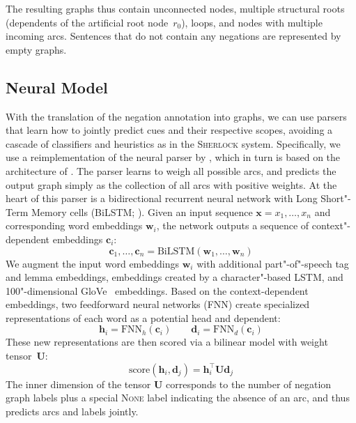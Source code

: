 \documentclass[11pt,a4paper]{article}
\let\vec=\mathbold
\theoremstyle{plain}
\begin{document}
The resulting graphs thus contain unconnected nodes, multiple structural roots (dependents of the artificial root node~$r_0$),
loops, and nodes with multiple incoming arcs.
Sentences that do not contain any negations are represented by empty graphs.

\subsection{Neural Model}

With the translation of the negation annotation into
graphs, we can use parsers that learn how to jointly predict cues
and their respective scopes, avoiding a cascade of classifiers and
heuristics as in the \textsc{Sherlock} system.
Specifically, we use a reimplementation of the neural parser by
\citet{dozat2018simpler}, which in turn is based on
the architecture of \citet{kiperwasser2016simple}.
The parser learns to weigh all possible arcs, and predicts the output graph
simply as the collection of all arcs with positive weights.
At the heart of this parser is a bidirectional recurrent neural network
with Long Short"-Term Memory cells (BiLSTM;
\citealp{hochreiter1997long}).
Given an input sequence $\vec{x}=x_1,\dots,x_n$ and corresponding word embeddings $\vec{w}_i$, the network outputs a sequence
of context"-dependent embeddings $\vec{c}_i$:
\begin{displaymath}
  \vec{c}_1, \dots, \vec{c}_n = \text{BiLSTM}(\vec{w}_1, \dots, \vec{w}_n)
\end{displaymath}
We augment the input word embeddings $\vec{w}_i$ with additional part"-of"-speech tag and
lemma embeddings, embeddings created by a character"-based LSTM, and
100"-dimensional GloVe~\citep{pennington2014glove} embeddings.
Based on the context-dependent embeddings, two feedforward neural networks
(FNN) create specialized representations of each word as a potential head and
dependent:
\begin{displaymath}
  \vec{h}_i = \text{FNN}_h(\vec{c}_i) \qquad
  \vec{d}_i = \text{FNN}_d(\vec{c}_i)
\end{displaymath}
These new representations are then scored via a bilinear model with weight 
tensor~$\vec{U}$:
\begin{displaymath}
  \text{score}(\vec{h}_i, \vec{d}_j) = \vec{h}_i^\top \vec{U} \vec{d}_j
\end{displaymath}
The inner dimension of the tensor $\vec{U}$ corresponds to the number of negation graph labels
plus a special \textsc{None} label indicating the absence of an arc, and thus
predicts arcs and labels jointly.
\end{document}
